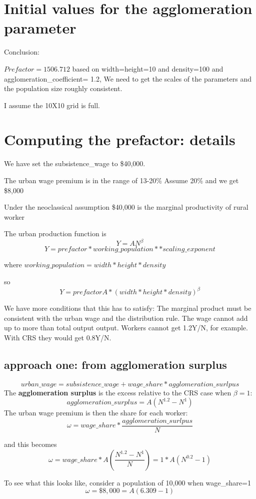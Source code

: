 \renewcommand{\sfdefault}{phv}

\section{Initial values for  the agglomeration parameter}
Conclusion:

{\Large  $Prefactor = 1506.712$ based on width=height=10 and density=100} and agglomeration\_coefficient= 1.2,
We need to get the scales of the parameters and the population size roughly consistent.

I assume the 10X10 grid is full. 

\section{Computing the prefactor: details}
We have set the subsistence\_wage to \$40,000.

The urban wage premium is in the range of 13-20\%  Assume 20\% and we get \$8,000

Under the neoclassical assumption  \$40,000 is the  marginal productivity of rural worker

The urban production function is 
\[Y=AN^\beta\]
\[Y=prefactor*working\_population**scaling\_exponent\]

where $working\_population = width*height*density$ 

so 
\[Y=prefactorA*(width*height*density)^{\beta}\]

We have more conditions that this has to satisfy: The marginal product must be consistent with the urban wage and the distribution rule. The wage cannot add up to more than total output output. Workers cannot get 1.2Y/N, for example. With CRS they would get 0.8Y/N.    

\subsection{approach one: from agglomeration surplus}
\[urban\_wage= subsistence\_wage + wage\_share * agglomeration\_surlpus\]
The \textbf{agglomeration surplus} is the excess relative to the CRS case when $\beta=1$:
\[agglomeration\_surplus= A(N^{1.2} -N^1) \]
The urban wage premium is then the share for each worker:
\[\omega= wage\_share * \frac{agglomeration\_surlpus}{N}\]

and this becomes
\[\omega= wage\_share * A\left(\frac{N^{1.2}-N^1}{N}\right)=1 * A\left(N^{0.2}-1\right)\]

To see what this looks like, consider a population of 10,000 when  wage\_share=1
\[\omega= \$8,000 = A\left( 6.309-1 \right)\]

